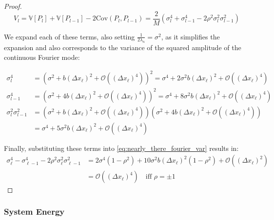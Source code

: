 \begin{proof}
    \begin{equation}\label{eq:nearly_there_fourier_var}
        V_l = \mathbb{V}[P_l] + \mathbb{V}[P_{l-1}] - 
        2\mathrm{Cov}(P_l, P_{l-1}) = 
        \frac{2}{M}(\sigma_l^4 + \sigma_{l-1}^4 -
        2\rho^2 \sigma_l^2 \sigma_{l-1}^2)
    \end{equation}

    We expand each of these terms, also setting 
    $\frac{1}{2\lambda_n} = \sigma^2$, as it simplifies the expansion and 
    also corresponds to the variance of the squared amplitude of the
    continuous Fourier mode:

    \begin{align*}
        \sigma_l^4 &= \left(\sigma^2 + b (\Delta x_\ell)^2 + 
        \mathcal{O}\left((\Delta x_\ell)^4\right)\right)^2 = 
        \sigma^4 + 
        2 \sigma^2 b (\Delta x_\ell)^2 + \mathcal{O}\left((\Delta x_\ell)^4\right)
        \\
        \sigma_{l-1}^4 &= \left(\sigma^2 + 4b (\Delta x_\ell)^2 + 
        \mathcal{O}\left((\Delta x_\ell)^4\right)\right)^2 =
        \sigma^4 + 8\sigma^2 b(\Delta x_\ell)^2 + 
        \mathcal{O}\left((\Delta x_\ell)^4\right)
        \\
        \sigma_l^2 \sigma_{l-1}^2 &= \left(\sigma^2+ b(\Delta x_\ell)^2 + 
        \mathcal{O}\left((\Delta x_\ell)^4\right)\right)(\sigma^2
        + 4b(\Delta x_\ell)^2 + \mathcal{O}\left((\Delta x_\ell)^4\right))\\
        &= \sigma^4 + 5\sigma^2b(\Delta x_\ell)^2 + 
        \mathcal{O}\left((\Delta x_\ell)^4\right)
    \end{align*}

    Finally, substituting these terms into \eqref{eq:nearly_there_fourier_var}
    results in:
    \begin{align*}
        \sigma_\ell^4 - \sigma_{\ell-1}^4 - 2\rho^2 \sigma_\ell^2 
        \sigma_{\ell-1}^2 &= 2 \sigma^4(1 - \rho^2) + 10 \sigma^2b 
        (\Delta x_\ell)^2(1 - \rho^2) + 
        \mathcal{O}\left((\Delta x_\ell)^2\right) \\
        &= \mathcal{O}\left((\Delta x_\ell)^4\right) \quad \text{iff } 
        \rho = \pm 1
    \end{align*}

\end{proof}


\subsubsection{System Energy}

